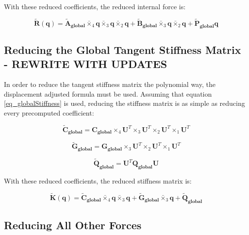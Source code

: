 \documentclass[twocolumn,10pt]{asme2ej}
\begin{document}
With these reduced coefficients, the reduced internal force is:

\begin{equation}
  \bm{\tilde{R}}(\bm{q}) = \bm{\tilde{A}_{global}} \bar{\times}_4 \bm{q} \bar{\times}_3 \bm{q} \bar{\times}_2 \bm{q}
  + \bm{\tilde{B}_{global}} \bar{\times}_3 \bm{q} \bar{\times}_2 \bm{q} + \bm{\tilde{P}_{global}}\bm{q}
  \label{eq_reducedForce}
\end{equation}

\subsection{Reducing the Global Tangent Stiffness Matrix - REWRITE WITH UPDATES}

In order to reduce the tangent stiffness matrix the polynomial way, the displacement adjusted formula must be used. Assuming that equation \ref{eq_globalStiffness} is used, reducing the stiffness matrix is as simple as reducing every precomputed coefficient:

\begin{equation}
  \bm{\tilde{C}_{global}} = \bm{C_{global}} \times_4 \bm{U}^T  \times_3 \bm{U}^T  \times_2 \bm{U}^T  \times_1 \bm{U}^T
\end{equation}

\begin{equation}
  \bm{\tilde{G}_{global}} = \bm{G_{global}} \times_3 \bm{U}^T  \times_2 \bm{U}^T  \times_1 \bm{U}^T
\end{equation}

\begin{equation}
  \bm{\tilde{Q}_{global}} = \bm{U}^T \bm{Q_{global}} \bm{U}
\end{equation}

With these reduced coefficients, the reduced stiffness matrix is:

\begin{equation}
  \bm{\tilde{K}}(\bm{q}) = \bm{\tilde{C}_{global}} \bar{\times}_4 \bm{q} \bar{\times}_3 \bm{q}
  + \bm{\tilde{G}_{global}} \bar{\times}_3 \bm{q} + \bm{\tilde{Q}_{global}}
  \label{eq_reducedStiffness}
\end{equation}

\subsection{Reducing All Other Forces}
\end{document}
